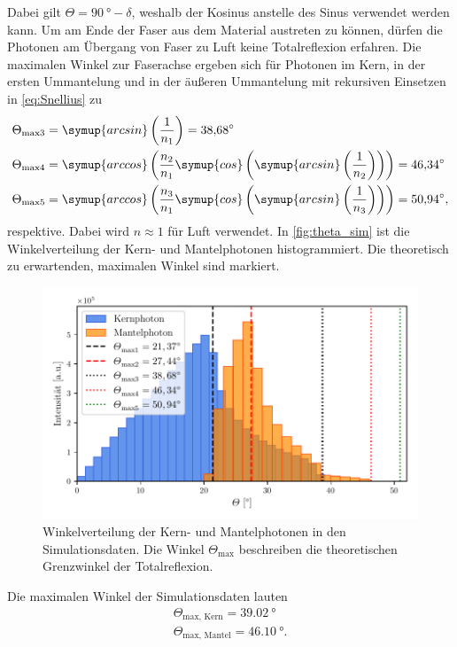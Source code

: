 Dabei gilt $\Theta = \qty{90}{\degree} - \delta$, weshalb der Kosinus anstelle des Sinus verwendet werden kann.
Um am Ende der Faser aus dem Material austreten zu können, dürfen die Photonen am Übergang von Faser zu Luft keine Totalreflexion erfahren. 
Die maximalen Winkel zur Faserachse ergeben sich für Photonen im Kern, in der ersten Ummantelung und in der äußeren Ummantelung mit rekursiven Einsetzen in \autoref{eq:Snellius} zu 
\begin{align*}
  \Theta_\text{max3} &= \symup{arcsin}\left(\frac{1}{n_1}\right) = \qty{38.68}{\degree} \\
  \Theta_\text{max4} &= \symup{arccos}\left(\frac{n_2}{n_1}\symup{cos}\left(\symup{arcsin}\left(\frac{1}{n_2}\right)\right)\right) = \qty{46.34}{\degree} \\
  \Theta_\text{max5} &= \symup{arccos}\left(\frac{n_3}{n_1}\symup{cos}\left(\symup{arcsin}\left(\frac{1}{n_3}\right)\right)\right) = \qty{50.94}{\degree}, \\
\end{align*}
respektive. Dabei wird $n \approx 1$ für Luft verwendet.
In \autoref{fig:theta_sim} ist die Winkelverteilung der Kern- und Mantelphotonen histogrammiert. Die theoretisch zu erwartenden, maximalen Winkel sind markiert.
\begin{figure}
  \centering
  \includegraphics[width = .8\textwidth]{content/pics/theta_sim.pdf}
  \caption{Winkelverteilung der Kern- und Mantelphotonen in den Simulationsdaten. Die Winkel $\Theta_\text{max}$ beschreiben die theoretischen Grenzwinkel der Totalreflexion.}
  \label{fig:theta_sim}
\end{figure}
Die maximalen Winkel der Simulationsdaten lauten 
\begin{align*}
  \Theta_\text{max, Kern} = \qty{39.02}{\degree} \\
  \Theta_\text{max, Mantel} = \qty{46.10}{\degree}.
\end{align*}

